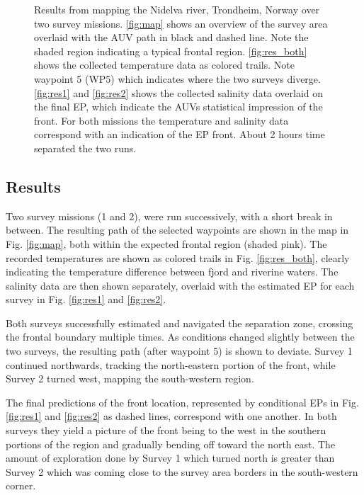 \documentclass[aoas]{imsart}
\begin{document}
\begin{figure}[!h]
\caption{Results from mapping the Nidelva river, Trondheim, Norway
  over two survey missions. \ref{fig:map} shows an overview of the
  survey area overlaid with the AUV path in black and dashed
  line. Note the shaded region indicating a typical frontal
  region. \ref{fig:res_both} shows the collected temperature data as
  colored trails. Note waypoint 5 (WP5) which indicates where the two
  surveys diverge. \ref{fig:res1} and \ref{fig:res2} shows the
  collected salinity data overlaid on the final EP, which indicate the
  AUVs statistical impression of the front. For both missions the
  temperature and salinity data correspond with an indication of the
  EP front. About 2 hours time separated the two runs.}
\label{fig:results}
\end{figure}

\subsection{Results}

Two survey missions (1 and 2), were run successively, with a short break in between. The resulting path of the
selected waypoints are shown in the map in Fig. \ref{fig:map}, both
within the expected frontal region (shaded pink). The recorded
temperatures are shown as colored trails in Fig. \ref{fig:res_both},
clearly indicating the temperature difference between fjord and
riverine waters. The salinity data are then shown separately, overlaid
with the estimated EP for each survey in Fig. \ref{fig:res1} and
\ref{fig:res2}.

Both surveys successfully estimated and navigated the separation zone,
crossing the frontal boundary multiple times. As conditions changed
slightly between the two surveys, the resulting path (after waypoint
5) is shown to deviate. Survey 1 continued northwards, tracking the
north-eastern portion of the front, while Survey 2 turned west,
mapping the south-western region.

The final predictions of the front location, represented by
conditional EPs in Fig. \ref{fig:res1} and \ref{fig:res2} as dashed
lines, correspond with one another. In both surveys they yield a
picture of the front being to the west in the southern portions of the
region and gradually bending off toward the north east. The amount of
exploration done by Survey 1 which turned north is greater than Survey 2 which was coming close to the survey area borders in the south-western
corner.
\end{document}
